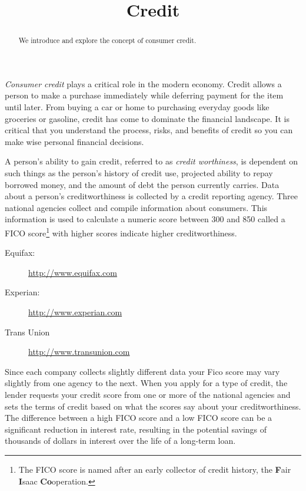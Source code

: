 \documentclass{ximera}
\title{Credit}
\begin{document}
\begin{abstract}
We introduce and explore the concept of consumer credit.
\end{abstract}

\maketitle

\emph{Consumer credit} plays a critical role in the modern economy. Credit allows a person to make a purchase immediately while deferring payment for the item until later. From buying a car or home to purchasing everyday goods like groceries or gasoline, credit has come to dominate the financial landscape. It is critical that you understand the process, risks, and benefits of credit so you can make wise personal financial decisions.

A person's ability to gain credit, referred to as \emph{credit worthiness}, is dependent on such things as the person's history of credit use, projected ability to repay borrowed money, and the amount of debt the person currently carries. Data about a person's creditworthiness is collected by a credit reporting agency. Three national agencies collect and compile information about consumers. This information is used to calculate a numeric score between 300 and 850 called a FICO score\footnote{The FICO score is named after an early collector of credit history, the \textbf{F}air \textbf{I}saac \textbf{Co}operation.} with higher scores indicate higher creditworthiness.
\begin{description}
\item[Equifax:] \href{http://www.equifax.com}{http://www.equifax.com}
\item[Experian:] \href{http://www.experian.com}{http://www.experian.com}
\item[Trans Union] \href{http://www.transunion.com}{http://www.transunion.com}
\end{description}

Since each company collects slightly different data your Fico score may vary slightly from one agency to the next.  When you apply for a type of credit, the lender requests your credit score from one or more of the national agencies and sets the terms of credit based on what the scores say about your creditworthiness. The difference between a high FICO score and a low FICO score can be a significant reduction in interest rate, resulting in the potential savings of thousands of dollars in interest over the life of a long-term loan.
\end{document}
